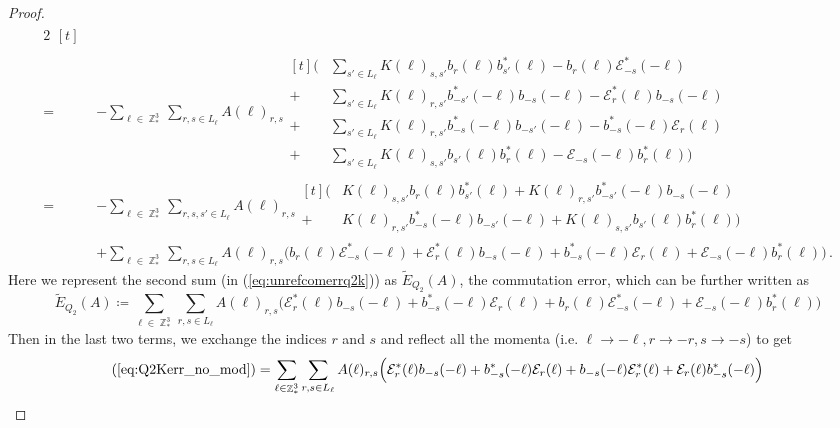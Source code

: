 \documentclass[sn-mathphys, Numbered ,a4paper]{sn-jnl}%
\DeclareMathOperator{\Z}{\mathbb{Z}}
\theoremstyle{plain}
\theoremstyle{definition}
\theoremstyle{remark}
\theoremstyle{plain}
\theoremstyle{definition}
\theoremstyle{remark}
\begin{document}
\begin{proof}
\begin{alignat}{2}
\begin{aligned}[t]
    \end{aligned}\nonumber\\
    = &-\sum\limits_{\ell \in \Z^3_*}\sum\limits_{r,s \in L_{\ell}}A(\ell)_{r,s}\begin{aligned}[t]
        \Big(&\sum\limits_{s'\in L_{\ell}}K(\ell)_{s,s'}b_{r}(\ell)b^*_{s'}(\ell) - b_{r}(\ell) \mathcal{E}^*_{-s}(-\ell)\\ + &\sum\limits_{s'\in L_{\ell}}K(\ell)_{r,s'}b^*_{-s'}(-\ell)b_{-s}(-\ell) - \mathcal{E}^*_{r}(\ell)b_{-s}(-\ell)\\+&\sum\limits_{s'\in L_{\ell}} K(\ell)_{r,s'}b^*_{-s}(-\ell)b_{-s'}(-\ell) -b^*_{-s}(-\ell) \mathcal{E}_{r}(\ell)\\ + &\sum\limits_{s'\in L_{\ell}}K(\ell)_{s,s'}b_{s'}(\ell)b^*_{r}(\ell) - \mathcal{E}_{-s}(-\ell)b^*_{r}(\ell) \Big)
    \end{aligned}\nonumber\\
     =&-\sum\limits_{\ell \in \Z^3_*}\sum\limits_{r,s,s' \in L_{\ell}}A(\ell)_{r,s}\begin{aligned}[t]
        \Big(&K(\ell)_{s,s'}b_{r}(\ell)b^*_{s'}(\ell)  + K(\ell)_{r,s'}b^*_{-s'}(-\ell)b_{-s}(-\ell) \\+& K(\ell)_{r,s'}b^*_{-s}(-\ell)b_{-s'}(-\ell) + K(\ell)_{s,s'}b_{s'}(\ell)b^*_{r}(\ell)\Big)
        \end{aligned}\nonumber\\
    &+\sum\limits_{\ell \in \Z^3_*}\sum\limits_{r,s \in L_{\ell}}A(\ell)_{r,s}\Big(b_{r}(\ell) \mathcal{E}^*_{-s}(-\ell) +\mathcal{E}^*_{r}(\ell)b_{-s}(-\ell) +b^*_{-s}(-\ell) \mathcal{E}_{r}(\ell)+ \mathcal{E}_{-s}(-\ell)b^*_{r}(\ell) \Big)\, .\label{eq:unrefcomerrq2k}
\end{alignat}
Here we represent the second sum (in (\ref{eq:unrefcomerrq2k})) as $\tilde{E}_{Q_2}(A)$, the commutation error, which can be further written as
\begin{equation}
    \tilde E_{Q_2}(A) \coloneq \sum\limits_{\ell \in \Z^3_*}\sum\limits_{r,s \in L_{\ell}}A(\ell)_{r,s}\Big( \mathcal{E}^*_{r}(\ell)b_{-s}(-\ell) +b^*_{-s}(-\ell) \mathcal{E}_{r}(\ell)+b_{r}(\ell) \mathcal{E}^*_{-s}(-\ell)+ \mathcal{E}_{-s}(-\ell)b^*_{r}(\ell) \Big)\label{eq:Q2Kerr_no_mod}
\end{equation}
Then in the last two terms, we exchange the indices $r$ and $s$ and reflect all the momenta (i.e. $\ell\rightarrow -\ell,r\rightarrow -r,s\rightarrow -s$) to get
\begin{align}
    (\ref{eq:Q2Kerr_no_mod})&=\sum\limits_{\ell \in \Z^3_*}\sum\limits_{r,s \in L_{\ell}}A(\ell)_{r,s}\Big( \mathcal{E}^*_{r}(\ell)b_{-s}(-\ell) +b^*_{-s}(-\ell) \mathcal{E}_{r}(\ell)+b_{-s}(-\ell) \mathcal{E}^*_{r}(\ell)+ \mathcal{E}_{r}(\ell)b^*_{-s}(-\ell) \Big)\nonumber\\

\end{align}
\end{proof}
\end{document}
